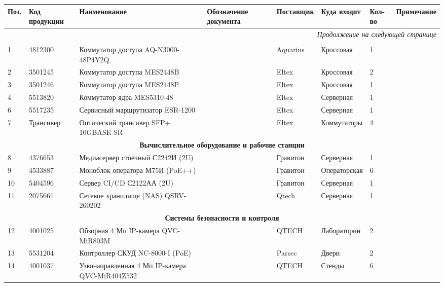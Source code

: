 \documentclass{bmstu}
\begin{document}
\begin{appendices}
\begin{landscape}
\begin{small}
\begin{longtable}{|p{0.8cm}|p{2.5cm}|p{6.2cm}|p{2.3cm}|p{2.3cm}|p{3.2cm}|p{1.2cm}|p{3.0cm}|}
\hline
\centering \textbf{Поз.} &
\centering \textbf{Код продукции} &
\centering \textbf{Наименование} &
\centering \textbf{Обозначение документа} &
\centering \textbf{Поставщик} &
\centering \textbf{Куда входит} &
\centering \textbf{Кол-во} &
\centering \textbf{Примечание} \tabularnewline
\hline
\endhead
\hline \multicolumn{8}{r}{\textit{Продолжение на следующей странице}} \\
\endfoot
\hline
\endlastfoot

\multicolumn{8}{|c|}{\textbf{Активное сетевое оборудование}} \\ \hline
1 & 4812300 & Коммутатор доступа AQ-N3000-48P4Y2Q & & Aquarius & Кроссовая & 1 & \\ \hline
2 & 3501245 & Коммутатор доступа MES2448B & & Eltex & Кроссовая & 2 & \\ \hline
3 & 3501246 & Коммутатор доступа MES2448P & & Eltex & Кроссовая & 1 & \\ \hline
4 & 5513820 & Коммутатор ядра MES5310-48 & & Eltex & Серверная & 1 & \\ \hline
6 & 5517235 & Сервисный маршрутизатор ESR-1200 & & Eltex & Серверная & 1 & \\ \hline
7 & Трансивер & Оптический трансивер SFP+ 10GBASE-SR & & Eltex & Коммутаторы & 4 & \\ \hline

\multicolumn{8}{|c|}{\textbf{Вычислительное оборудование и рабочие станции}} \\ \hline
8 & 4376653 & Медиасервер стоечный С2242И (2U) & & Гравитон & Серверная & 1 & \\ \hline
9 & 4533887 & Моноблок оператора М75И (PoE++) & & Гравитон & Операторская & 6 & \\ \hline
10 & 5404596 & Сервер CI/CD С2122АА (2U) & & Гравитон & Серверная & 1 & \\ \hline
11 & 2075661 & Сетевое хранилище (NAS) QSRV-260202 & & Qtech & Серверная & 1 & \\ \hline

\multicolumn{8}{|c|}{\textbf{Системы безопасности и контроля}} \\ \hline
12 & 4001025 & Обзорная 4 Мп IP-камера QVC-MiR803M & & QTECH & Лаборатории & 2 & \\ \hline
13 & 5531204 & Контроллер СКУД NC-8000-I (PoE) & & Parsec & Двери & 2 & \\ \hline
14 & 4001037 & Узконаправленная 4 Мп IP-камера QVC-MiR404Z532 & & QTECH & Стенды & 6 & \\ \hline


\end{longtable}
\end{small}
\end{landscape}
\end{appendices}
\end{document}
